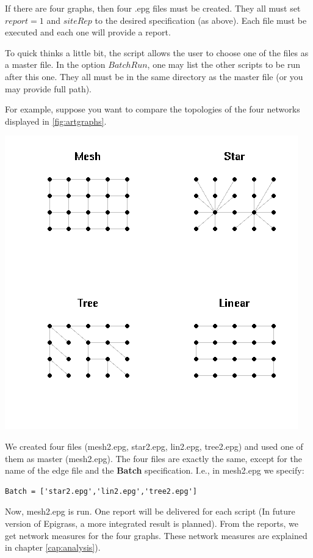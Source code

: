 If there are four graphs, then four .epg files must be created. They all must set $report=1$ and $siteRep$ to the desired specification (as above). Each file must be executed and each one will provide a report. 

To quick thinks a little bit, the script allows the user to choose one of the files as a master file. In the option $BatchRun$, one may list the other scripts to be run after this one. They all must be in the same directory as the master file (or you may provide full path).

For example, suppose you want to compare the topologies of the four networks displayed in \ref{fig:artgraphs}.
 
 \begin{center}
\includegraphics[scale=0.5]{artgraphs.png}
\label{fig:artgraphs}
\end{center}

 
We created four files (mesh2.epg, star2.epg, lin2.epg, tree2.epg) and used one of them as master (mesh2.epg). The four files are exactly the same, except for the name of the edge file and the \textbf{Batch} specification. I.e., in mesh2.epg we specify:
\begin{verbatim}
Batch = ['star2.epg','lin2.epg','tree2.epg']
\end{verbatim}
Now, mesh2.epg is run. One report will be delivered for each script (In future version of Epigrass, a more integrated result is planned). From the reports, we get network measures for the four graphs. These network measures are explained in chapter \ref{cap:analysis}). 


